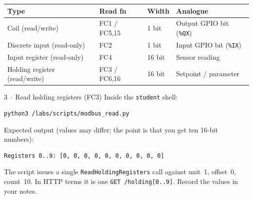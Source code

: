 \documentclass[11pt,a4paper]{article}
\begin{document}
\smallskip
\begin{center}
\footnotesize
\begin{tabular}{@{}llll@{}}
\toprule
\textbf{Type} & \textbf{Read fn} & \textbf{Width} & \textbf{Analogue} \\
\midrule
Coil (read/write)               & FC1 / FC5,15 & 1 bit  & Output GPIO bit (\texttt{\%QX}) \\
Discrete input (read-only)      & FC2          & 1 bit  & Input GPIO bit (\texttt{\%IX}) \\
Input register (read-only)      & FC4          & 16 bit & Sensor reading \\
Holding register (read/write)   & FC3 / FC6,16 & 16 bit & Setpoint / parameter \\
\bottomrule
\end{tabular}
\end{center}

\begin{stepbox}{3 -- Read holding registers (FC3)}
Inside the \texttt{student} shell:
\begin{lstlisting}[language=bash]
python3 /labs/scripts/modbus_read.py
\end{lstlisting}
Expected output (values may differ; the point is that you get ten 16-bit numbers):
\begin{lstlisting}
Registers 0..9: [0, 0, 0, 0, 0, 0, 0, 0, 0, 0]
\end{lstlisting}
The script issues a single \texttt{ReadHoldingRegisters} call against unit~1, offset~0, count~10. In HTTP terms it is one \texttt{GET /holding[0..9]}. Record the values in your notes.
\end{stepbox}
\end{document}
